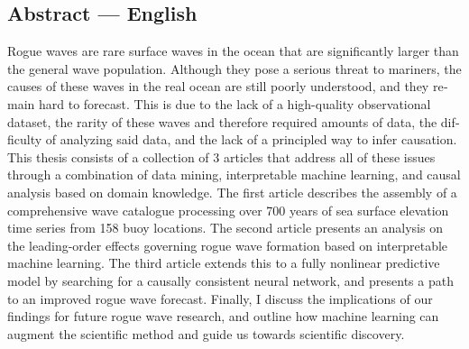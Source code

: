 
\clearpage

\begin{otherlanguage}{american}
\section*{Abstract --- English}
Rogue waves are rare surface waves in the ocean that are significantly larger than the general wave population. Although they pose a serious threat to mariners, the causes of these waves in the real ocean are still poorly understood, and they remain hard to forecast. This is due to the lack of a high-quality observational dataset, the rarity of these waves and therefore required amounts of data, the difficulty of analyzing said data, and the lack of a principled way to infer causation. This thesis consists of a collection of 3 articles that address all of these issues through a combination of data mining, interpretable machine learning, and causal analysis based on domain knowledge. The first article describes the assembly of a comprehensive wave catalogue processing over 700 years of sea surface elevation time series from 158 buoy locations. The second article presents an analysis on the leading-order effects governing rogue wave formation based on interpretable machine learning. The third article extends this to a fully nonlinear predictive model by searching for a causally consistent neural network, and presents a path to an improved rogue wave forecast. Finally, I discuss the implications of our findings for future rogue wave research, and outline how machine learning can augment the scientific method and guide us towards scientific discovery.
\end{otherlanguage}

